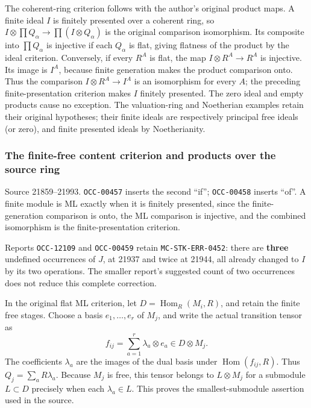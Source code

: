 The coherent-ring criterion follows with the author's original product maps. A finite ideal \(I\) is finitely presented over a coherent ring, so \(I\otimes\prod Q_\alpha\to\prod(I\otimes Q_\alpha)\) is the original comparison isomorphism. Its composite into \(\prod Q_\alpha\) is injective if each \(Q_\alpha\) is flat, giving flatness of the product by the ideal criterion. Conversely, if every \(R^A\) is flat, the map \(I\otimes R^A\to R^A\) is injective. Its image is \(I^A\), because finite generation makes the product comparison onto. Thus the comparison \(I\otimes R^A\to I^A\) is an isomorphism for every \(A\); the preceding finite-presentation criterion makes \(I\) finitely presented. The zero ideal and empty products cause no exception. The valuation-ring and Noetherian examples retain their original hypotheses; their finite ideals are respectively principal free ideals (or zero), and finite presented ideals by Noetherianity.

\subsubsection{The finite-free content criterion and products over the source ring}\label{algebra-proof-013-the-finite-free-content-criterion-and-products-over-the-source-ring}

Source 21859--21993. \texttt{OCC-00457} inserts the second ``if''; \texttt{OCC-00458} inserts ``of''. A finite module is ML exactly when it is finitely presented, since the finite-generation comparison is onto, the ML comparison is injective, and the combined isomorphism is the finite-presentation criterion.

Reports \texttt{OCC-12109} and \texttt{OCC-00459} retain \texttt{MC-STK-ERR-0452}: there are \textbf{three} undefined occurrences of \(J\), at 21937 and twice at 21944, all already changed to \(I\) by its two operations. The smaller report's suggested count of two occurrences does not reduce this complete correction.

In the original flat ML criterion, let \(D=\operatorname{Hom}_R(M_i,R)\), and retain the finite free stages. Choose a basis \(e_1,\ldots,e_r\) of \(M_j\), and write the actual transition tensor as \[
f_{ij}=\sum_{a=1}^r \lambda_a\otimes e_a\in D\otimes M_j.
\] The coefficients \(\lambda_a\) are the images of the dual basis under \(\operatorname{Hom}(f_{ij},R)\). Thus \(Q_j=\sum_aR\lambda_a\). Because \(M_j\) is free, this tensor belongs to \(L\otimes M_j\) for a submodule \(L\subset D\) precisely when each \(\lambda_a\in L\). This proves the smallest-submodule assertion used in the source.

